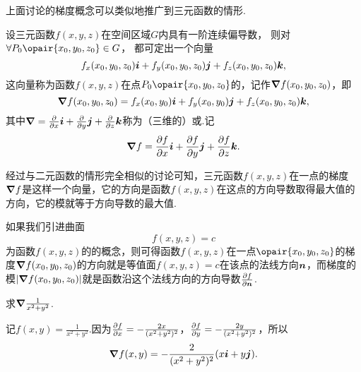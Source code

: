 上面讨论的梯度概念可以类似地推广到三元函数的情形.
\begin{definition}
设三元函数\(f(x,y,z)\)在空间区域\(G\)内具有一阶连续偏导数，%
则对\(\forall P_0\opair{x_0,y_0,z_0} \in G\)，%
都可定出一个向量\[
f_x(x_0,y_0,z_0) \boldsymbol{i} + f_y(x_0,y_0,z_0) \boldsymbol{j} + f_z(x_0,y_0,z_0) \boldsymbol{k},
\]这向量称为函数\(f(x,y,z)\)在点\(P_0\opair{x_0,y_0,z_0}\)的，记作\(\grad{f}(x_0,y_0,z_0)\)，即\[
\grad{f}(x_0,y_0,z_0)
= f_x(x_0,y_0) \boldsymbol{i} + f_y(x_0,y_0) \boldsymbol{j} + f_z(x_0,y_0,z_0) \boldsymbol{k},
\]其中\(\grad = \pdv{x} \boldsymbol{i} + \pdv{y} \boldsymbol{j} + \pdv{z} \boldsymbol{k}\)称为（三维的）或.记\[
\grad{f} = \pdv{f}{x} \boldsymbol{i} + \pdv{f}{y} \boldsymbol{j} + \pdv{f}{z} \boldsymbol{k}.
\]
\end{definition}

经过与二元函数的情形完全相似的讨论可知，三元函数\(f(x,y,z)\)在一点的梯度\(\grad{f}\)是这样一个向量，它的方向是函数\(f(x,y,z)\)在这点的方向导数取得最大值的方向，它的模就等于方向导数的最大值.

如果我们引进曲面\[
f(x,y,z) = c
\]为函数\(f(x,y,z)\)的的概念，则可得函数\(f(x,y,z)\)在一点\(\opair{x_0,y_0,z_0}\)的梯度\(\grad f(x_0,y_0,z_0)\)的方向就是等值面\(f(x,y,z) = c\)在该点的法线方向\(\boldsymbol{n}\)，而梯度的模\(\abs{\grad f(x_0,y_0,z_0)}\)就是函数沿这个法线方向的方向导数\(\pdv{f}{\boldsymbol{n}}\).

\begin{example}
求\(\grad \frac{1}{x^2+y^2}\).
\begin{solution}
记\(f(x,y) = \frac{1}{x^2+y^2}\).因为\(\pdv{f}{x} = -\frac{2x}{(x^2+y^2)^2}\)，\(\pdv{f}{y} = -\frac{2y}{(x^2+y^2)^2}\)，所以\[
\grad f(x,y) = -\frac{2}{(x^2+y^2)^2} (x \boldsymbol{i} + y \boldsymbol{j}).
\]
\end{solution}
\end{example}

